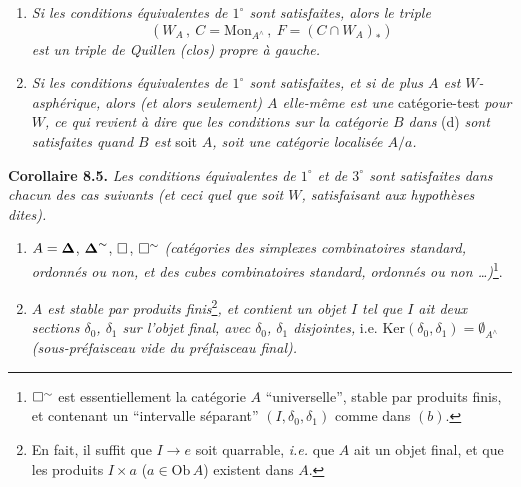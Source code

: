 \begin{enumerate}[leftmargin=2.5em]
\item[$2^\circ$)] \textit{Si les conditions équivalentes de $1^\circ$ sont satisfaites, alors le triple}
\[
(W_A\,,\ C = \mathrm{Mon}_{A^\wedge}\,,\ F = (C \cap W_A)_*)
\]
\textit{est un triple de Quillen (clos) propre à gauche.}
\item[$3^\circ$)] \textit{Si les conditions équivalentes de $1^\circ$ sont satisfaites, et si de plus $A$ est $W$-asphérique, alors (et alors seulement) $A$ elle-même est une} catégorie-test \textit{pour $W$, ce qui revient à dire que les conditions sur la catégorie $B$ dans} (d) \textit{sont satisfaites quand $B$ est} soit \textit{$A$, soit une catégorie localisée $A/a$.}
\end{enumerate}

\textbf{Corollaire 8.5.} \textit{Les conditions équivalentes de $1^\circ$ et de $3^\circ$ sont satisfaites dans chacun des cas suivants (et ceci quel que soit $W$, satisfaisant aux hypothèses dites).}
\begin{enumerate}[leftmargin=2.5em]
\item[a)] $A = \boldsymbol{\Delta}$, $\boldsymbol{\Delta}^{\sim}$, $\square$, $\square^{\sim}$ \textit{(catégories des simplexes combinatoires standard, ordonnés ou non, et des cubes combinatoires standard, ordonnés ou non \ldots)}\footnote[39]{$\square^{\sim}$ est essentiellement la catégorie $A$ “universelle”, stable par produits finis, et contenant un “intervalle séparant” $(I,\delta_0,\delta_1)$ comme dans $(b)$.}.
\item[b)] \textit{$A$ est stable par produits finis}\footnote[40]{En fait, il suffit que $I \longrightarrow e$ soit quarrable, \textit{i.e.} que $A$ ait un objet final, et que les produits $I \times a$ ($a \in \mathrm{Ob}\,A$) existent dans $A$.}\textit{, et contient un objet $I$ tel que $I$ ait deux sections $\delta_0$, $\delta_1$ sur l'objet final, avec $\delta_0$, $\delta_1$ disjointes,} i.e. $\mathrm{Ker}(\delta_0,\delta_1) = \emptyset_{A^\wedge}$ \textit{(sous-préfaisceau vide du préfaisceau final).}
\end{enumerate}


